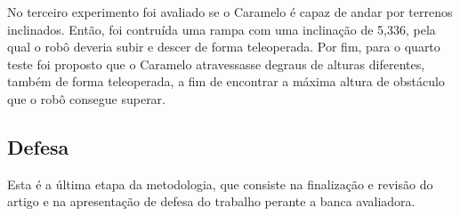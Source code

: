 \documentclass[../main.tex]{subfiles}
\begin{document}
  No terceiro experimento foi avaliado se o Caramelo é capaz de andar por terrenos inclinados. Então, foi contruída uma rampa com uma inclinação de 5,336\degree, pela qual o robô deveria subir e descer de forma teleoperada. Por fim, para o quarto teste foi proposto que o Caramelo atravessasse degraus de alturas diferentes, também de forma teleoperada, a fim de encontrar a máxima altura de obstáculo que o robô consegue superar.

  \subsection{Defesa}
  Esta é a última etapa da metodologia, que consiste na finalização e revisão do artigo e na apresentação de defesa do trabalho perante a banca avaliadora. 
\end{document}
